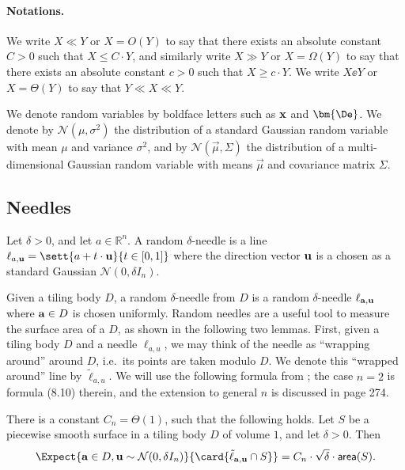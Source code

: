 \paragraph{Notations.}
We write $X\ll Y$ or $X = O(Y)$ to say that
there exists an absolute constant $C >0$ such that $X\leq C\cdot Y$,
and similarly write $X\gg Y$ or $X = \Omega(Y)$ to say that
there exists an absolute constant $c >0$ such that $X\geq c\cdot Y$.
We write $X\ee Y$ or $X = \Theta(Y)$ to say that $Y\ll X\ll Y$.


We denote random variables by boldface letters such as ${\bf x}$ and $\bm{\De}$.
We denote by $\mathcal{N}(\mu,\sigma^2)$ the distribution of a standard
Gaussian random variable with mean $\mu$ and variance $\sigma^2$, and by
$\mathcal{N}(\vec{\mu}, \Sigma)$ the distribution of a multi-dimensional
Gaussian random variable with means $\vec{\mu}$ and covariance matrix $\Sigma$.
\subsection{Needles}

\begin{definition}
  Let $\delta>0$, and let $a\in\mathbb{R}^n$. A random $\delta$-needle is a line $\ell_{a,{\bf u}} = \sett{a+t\cdot {\bf u}}{t\in[0,1]}$
  where the direction vector ${\bf u}$ is a chosen as a standard Gaussian $\mathcal{N}(0,\delta I_n)$.
\end{definition}

Given a tiling body $D$, a random $\delta$-needle from $D$ is a random $\delta$-needle $\ell_{{\bf a}, {\bf u}}$
where ${\bf a}\in D$ is chosen uniformly. Random needles are a useful tool to measure the surface area of a $D$, as shown
in the following two lemmas. First, given a tiling body $D$ and a needle $\ell_{a, u}$, we may think of the needle
as ``wrapping around'' around $D$,  i.e.\ its points are taken modulo $D$. We denote this ``wrapped around'' line by
$\tilde{\ell}_{a, u}$. We will use the following formula from \cite{Santalo}; the case $n=2$ is formula (8.10) therein,
and the extension to general $n$ is discussed in page 274.
\begin{lemma}\label{lem:santalo}
  There is a constant $C_n = \Theta(1)$, such that the following holds.
  Let $S$ be a piecewise smooth surface in a tiling body $D$ of volume $1$, and let $\delta>0$.
  Then
  \[
   \Expect{{\bf a}\in D, {\bf u}\sim\mathcal{N}(0,\delta I_n)}{\card{\tilde{\ell}_{{\bf a}, {\bf u}}\cap S}} = C_n \cdot\sqrt{\delta} \cdot {\sf area}(S).
  \]
\end{lemma}


